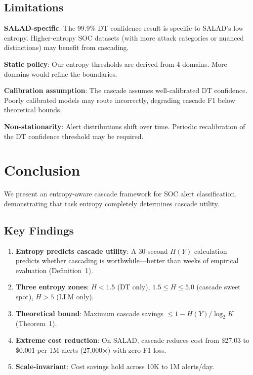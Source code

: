 \documentclass[review,3p]{elsarticle}
\begin{document}
\subsection{Limitations}
\textbf{SALAD-specific}: The 99.9\% DT confidence result is specific to SALAD's low entropy. Higher-entropy SOC datasets (with more attack categories or nuanced distinctions) may benefit from cascading.

\textbf{Static policy}: Our entropy thresholds are derived from 4 domains. More domains would refine the boundaries.

\textbf{Calibration assumption}: The cascade assumes well-calibrated DT confidence. Poorly calibrated models may route incorrectly, degrading cascade F1 below theoretical bounds.

\textbf{Non-stationarity}: Alert distributions shift over time. Periodic recalibration of the DT confidence threshold may be required.

\section{Conclusion}

We present an entropy-aware cascade framework for SOC alert classification, demonstrating that task entropy completely determines cascade utility.

\subsection{Key Findings}
\begin{enumerate}
\item \textbf{Entropy predicts cascade utility}: A 30-second $H(Y)$ calculation predicts whether cascading is worthwhile---better than weeks of empirical evaluation (Definition~1).
\item \textbf{Three entropy zones}: $H<1.5$ (DT only), $1.5 \leq H \leq 5.0$ (cascade sweet spot), $H>5$ (LLM only).
\item \textbf{Theoretical bound}: Maximum cascade savings $\leq 1 - H(Y)/\log_2 K$ (Theorem~1).
\item \textbf{Extreme cost reduction}: On SALAD, cascade reduces cost from \$27.03 to \$0.001 per 1M alerts (27,000$\times$) with zero F1 loss.
\item \textbf{Scale-invariant}: Cost savings hold across 10K to 1M alerts/day.
\end{enumerate}
\end{document}
